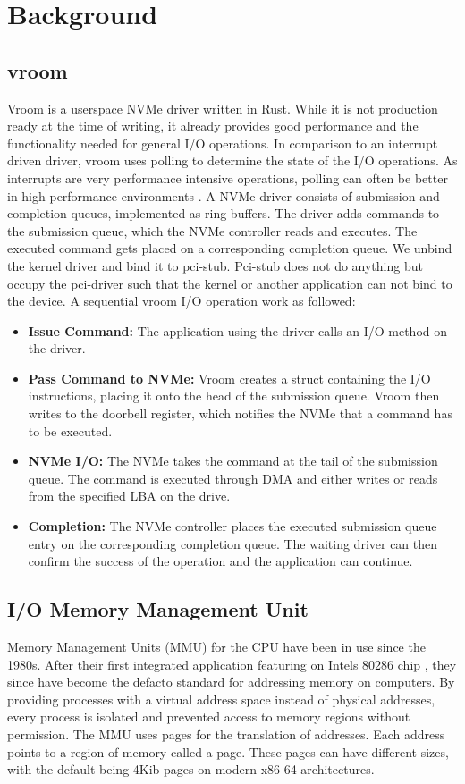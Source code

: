 \chapter{Background}

\section{vroom}
Vroom is a userspace NVMe driver written in Rust. While it is not production ready at the time of writing, it already provides good performance and the functionality needed for general I/O operations. In comparison to an interrupt driven driver, vroom uses polling to determine the state of the I/O operations. As interrupts are very performance intensive operations, polling can often be better in high-performance environments \cite{spdksubmitting}.
A NVMe driver consists of submission and completion queues, implemented as ring buffers. The driver adds commands to the submission queue, which the NVMe controller reads and executes. The executed command gets placed on a corresponding completion queue.
We unbind the kernel driver and bind it to pci-stub. Pci-stub does not do anything but occupy the pci-driver such that the kernel or another application can not bind to the device.
A sequential vroom I/O operation work as followed:
\begin{itemize}
    \item \textbf{Issue Command:} The application using the driver calls an I/O method on the driver.
    \item \textbf{Pass Command to NVMe:} Vroom creates a struct containing the I/O instructions, placing it onto the head of the submission queue. Vroom then writes to the doorbell register, which notifies the NVMe that a command has to be executed.
    \item \textbf{NVMe I/O:} The NVMe takes the command at the tail of the submission queue. The command is executed through DMA and either writes or reads from the specified LBA on the drive.
    \item \textbf{Completion:} The NVMe controller places the executed submission queue entry on the corresponding completion queue. The waiting driver can then confirm the success of the operation and the application can continue.
\end{itemize}

\section{I/O Memory Management Unit}
Memory Management Units (MMU) for the CPU have been in use since the 1980s. After their first integrated application featuring on Intels 80286 chip \cite{intel80286}, they since have become the defacto standard for addressing memory on computers. By providing processes with a virtual address space instead of physical addresses, every process is isolated and prevented access to memory regions without permission. The MMU uses pages for the translation of addresses. Each address points to a region of memory called a page. These pages can have different sizes, with the default being 4Kib pages on modern x86-64 architectures.

